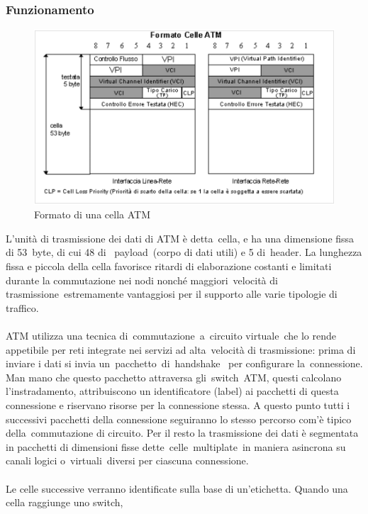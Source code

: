 \documentclass{article}
\begin{document}
\subsubsection{Funzionamento}
\begin{figure}[H]
    \center
    \includegraphics[scale=0.4]{images/ATM1.png}
    \caption{Formato di una cella ATM}\label{fig:1}
\end{figure}
\noindent
L'unità di trasmissione dei dati di ATM è detta cella, e ha una dimensione fissa di 53 byte, di cui 48 di 
payload (corpo di dati utili) e 5 di header. La lunghezza fissa e piccola della cella favorisce ritardi 
di elaborazione costanti e limitati durante la commutazione nei nodi nonché maggiori velocità di 
trasmissione estremamente vantaggiosi per il supporto alle varie tipologie di traffico.\\\\
ATM utilizza una tecnica di commutazione a circuito virtuale che lo rende appetibile per reti integrate 
nei servizi ad alta velocità di trasmissione: prima di inviare i dati si invia un pacchetto di handshake 
per configurare la connessione. Man mano che questo pacchetto attraversa gli switch ATM, questi calcolano 
l'instradamento, attribuiscono un identificatore (label) ai pacchetti di questa connessione e riservano 
risorse per la connessione stessa. A questo punto tutti i successivi pacchetti della connessione seguiranno 
lo stesso percorso com'è tipico della commutazione di circuito. Per il resto la trasmissione dei dati 
è segmentata in pacchetti di dimensioni fisse dette celle multiplate in maniera asincrona su canali logici 
o virtuali diversi per ciascuna connessione.\\\\
Le celle successive verranno identificate sulla base di un'etichetta. Quando una cella raggiunge uno switch, 
\end{document}
